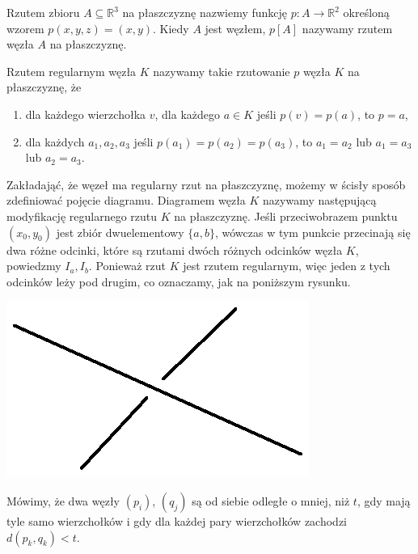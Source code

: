 \begin{definicja}
 Rzutem zbioru $A\subseteq\mathbb{R}^3$ na płaszczyznę nazwiemy funkcję $p\colon A\to\mathbb{R}^2$ określoną wzorem $p(x,y,z) = (x,y)$. Kiedy $A$ jest węzłem, $p[A]$ nazywamy 
 rzutem węzła $A$ na płaszczyznę.
\end{definicja}


\begin{definicja}
\label{rzut_reg}
 Rzutem regularnym węzła $K$ nazywamy takie rzutowanie $p$ węzła $K$ na płaszczyznę, że
 \begin{enumerate}
  \item dla każdego wierzchołka $v$, dla każdego $a\in K$ jeśli $p(v) = p(a)$, to $p=a$,
  \item dla każdych $a_1, a_2, a_3$ jeśli $p(a_1)=p(a_2)=p(a_3)$, to $a_1=a_2$ lub $a_1=a_3$ lub $a_2=a_3$.
 \end{enumerate}
\end{definicja}

Zakładająć, że węzeł ma regularny rzut na płaszczyznę, możemy w ścisły sposób zdefiniować pojęcie diagramu.
Diagramem węzła $K$ nazywamy następującą modyfikację regularnego rzutu $K$ na płaszczyznę. Jeśli przeciwobrazem punktu $(x_0, y_0)$ jest zbiór dwuelementowy 
$\lbrace a,b\rbrace$, wówczas w tym punkcie przecinają się dwa różne odcinki, które są rzutami dwóch różnych odcinków węzła $K$, powiedzmy $I_a, I_b$. 
Ponieważ rzut $K$ jest rzutem regularnym, więc jeden z tych odcinków leży pod drugim, co oznaczamy, jak na poniższym rysunku. 

\begin{minipage}{0.3\textwidth}
	\begin{center}

	\includegraphics[scale=0.8]{1/pictures/skrz.eps}
	\end{center}
	\end{minipage}

\begin{definicja}
 Mówimy, że dwa węzły $(p_i)$, $(q_j)$ są od siebie odległe o mniej, niż $t$, gdy mają tyle samo wierzchołków i gdy dla każdej pary wierzchołków zachodzi $d(p_k,q_k) < t$.
\end{definicja}

